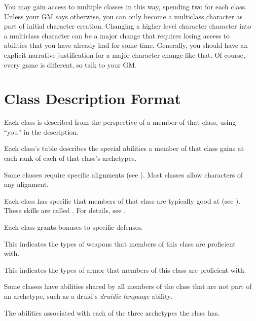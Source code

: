            You may gain access to multiple classes in this way, spending two  for each class.
            Unless your GM says otherwise, you can only become a multiclass character as part of initial character creation.
            Changing a higher level character character into a multiclass character can be a major change that requires losing access to abilities that you have already had for some time.
            Generally, you should have an explicit narrative justification for a major character change like that.
            Of course, every game is different, so talk to your GM.

\section{Class Description Format}
    Each class is described from the perspective of a member of that class, using ``you'' in the description.

    Each class's table describes the special abilities a member of that class gains at each rank of each of that class's archetypes.

    Some classes require specific alignments (see ).
    Most classes allow characters of any alignment.

    Each class has specific  that members of that class are typically good at (see ).
    These skills are called .
    For details, see .

    Each class grants bonuses to specific defenses.

    This indicates the types of weapons that members of this class are proficient with.

    This indicates the types of armor that members of this class are proficient with.

    Some classes have abilities shared by all members of the class that are not part of an archetype, such as a druid's \textit{druidic language} ability.

    The abilities associated with each of the three archetypes the class has.


